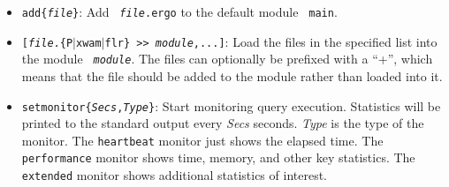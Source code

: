 \documentclass[11pt]{article}
\newcommand{\ergoext}{ergo\xspace}
\newcommand{\ofile}{xwam}
\begin{document}
\begin{itemize}
{    add\{\textnormal{\emph{file}}>{}>\textnormal{\emph{module}}\}}: Add
  {\tt \textnormal{\emph{file}}.\ergoext} to the module {\tt
    \textnormal{\emph{module}}}.
\item {\tt add\{\textnormal{\emph{file}}\}}: Add {\tt
    \textnormal{\emph{file}}.\ergoext} to the default module {\tt
    main}. 
\item {\tt [\textnormal{\emph{file}}.\{P$|$\ofile$|$flr\} \texttt{>{}>} 
    \textnormal{\emph{module}},...]}:
    Load the files in the specified list into the module {\tt
      \textnormal{\emph{module}}}.
    The files can optionally be prefixed with a ``+'', which means that the
    file should be added to the module rather than loaded into it.
\item {\tt setmonitor\{\textnormal{\emph{Secs}},\textnormal{\emph{Type}}\}}:
  Start monitoring query execution. Statistics will be printed to the
  standard output every \textit{Secs} seconds. \textit{Type} is the type of
  the monitor. The \texttt{heartbeat} monitor just shows the elapsed time.
  The \texttt{performance} monitor shows time, memory, and other
  key statistics. The \texttt{extended} monitor shows additional
  statistics of interest.


\end{itemize}
\end{document}
